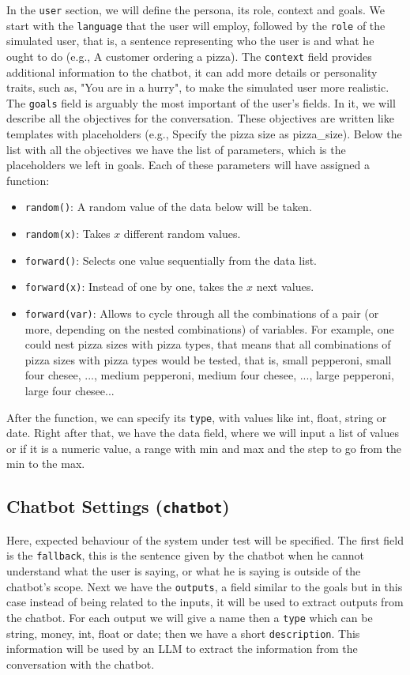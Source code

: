 In the \texttt{user} section, we will define
the persona, its role, context and goals.
We start with the \texttt{language} that the user will employ,
followed by the \texttt{role} of the simulated user,
that is, a sentence representing who the user is
and what he ought to do (e.g., A customer ordering a pizza).
The \texttt{context} field provides additional information to the chatbot,
it can add more details or personality traits, such as,
"You are in a hurry", to make the simulated user more realistic.
The \texttt{goals} field is arguably the most important of the user's fields.
In it, we will describe all the objectives for the conversation.
These objectives are written like templates with placeholders
(e.g., Specify the pizza size as {{pizza\_size}}).
Below the list with all the objectives
we have the list of parameters, which is the placeholders we left in goals.
Each of these parameters will have assigned a function:
\begin{itemize}
  \item \texttt{random()}: A random value of the data below will be taken.
  \item \texttt{random(x)}: Takes $x$ different random values.
  \item \texttt{forward()}: Selects one value sequentially from the data list.
  \item \texttt{forward(x)}: Instead of one by one, takes the $x$ next values.
  \item \texttt{forward(var)}: 
    Allows to cycle through all the combinations of a pair (or more, depending on the nested combinations) of variables.
    For example, one could nest pizza sizes with pizza types,
    that means that all combinations of pizza sizes with pizza types would be tested,
    that is, small pepperoni, small four chesee, ..., medium pepperoni, medium four chesee, ..., large pepperoni, large four chesee...
\end{itemize}
After the function, we can specify its \texttt{type},
with values like int, float, string or date.
Right after that, we have the data field,
where we will input a list of values
or if it is a numeric value, a range with min and max
and the step to go from the min to the max.

\subsection{Chatbot Settings (\texttt{chatbot})}

Here, expected behaviour of the system under test will be specified.
The first field is the \texttt{fallback},
this is the sentence given by the chatbot when he cannot understand what the user is saying,
or what he is saying is outside of the chatbot's scope.
Next we have the \texttt{outputs}, a field similar to the goals
but in this case instead of being related to the inputs,
it will be used to extract outputs from the chatbot.
For each output we will give a name
then a \texttt{type} which can be string, money, int, float or date;
then we have a short \texttt{description}.
This information will be used by an \ac{LLM}
to extract the information from the conversation with the chatbot.


